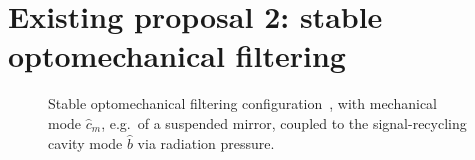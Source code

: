 \section{Existing proposal 2: stable optomechanical filtering}
\label{sec:sWLC}

\begin{figure}
	\centering
	\caption{Stable optomechanical filtering configuration~\cite{Li2021}, with mechanical mode $\hat{c}_m$, e.g.\ of a suspended mirror, coupled to the signal-recycling cavity mode $\hat b$ via radiation pressure.}
	\label{fig:sWLC_config}
\end{figure}


